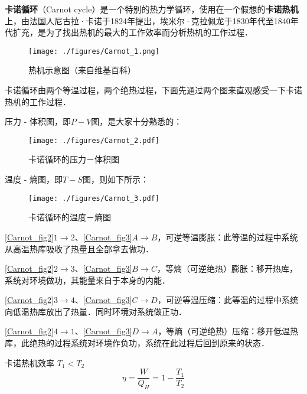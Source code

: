 
\textbf{卡诺循环}（Carnot cycle）是一个特别的热力学循环，使用在一个假想的\textbf{卡诺热机}上，由法国人尼古拉·卡诺于1824年提出，埃米尔·克拉佩龙于1830年代至1840年代扩充，是为了找出热机的最大的工作效率而分析热机的工作过程．

\begin{figure}[ht]
\centering
\texttt{[image: ./figures/Carnot\_1.png]}
\caption{热机示意图（来自维基百科）} \label{Carnot_fig1}
\end{figure}
卡诺循环由两个等温过程，两个绝热过程，下面先通过两个图来直观感受一下卡诺热机的工作过程．

压力 - 体积图，即$P-V$图，是大家十分熟悉的：
\begin{figure}[ht]
\centering
\texttt{[image: ./figures/Carnot\_2.pdf]}
\caption{卡诺循环的压力－体积图} \label{Carnot_fig2}
\end{figure}

温度 - 熵图，即$T-S$图，则如下所示：
\begin{figure}[ht]
\centering
\texttt{[image: ./figures/Carnot\_3.pdf]}
\caption{卡诺循环的温度－熵图} \label{Carnot_fig3}
\end{figure}

\autoref{Carnot_fig2}$1\to 2$、\autoref{Carnot_fig3}$A\to B$，可逆等温膨胀：此等温的过程中系统从高温热库吸收了热量且全部拿去做功．

\autoref{Carnot_fig2}$2\to 3$、\autoref{Carnot_fig3}$B\to C$，等熵（可逆绝热）膨胀：移开热库，系统对环境做功，其能量来自于本身的内能．

\autoref{Carnot_fig2}$3\to 4$、\autoref{Carnot_fig3}$C\to D$，可逆等温压缩：此等温的过程中系统向低温热库放出了热量．同时环境对系统做正功．

\autoref{Carnot_fig2}$4\to 1$、\autoref{Carnot_fig3}$D\to A$，等熵（可逆绝热）压缩：移开低温热库，此绝热的过程系统对环境作负功，系统在此过程后回到原来的状态．


卡诺热机效率 $T_1 < T_2$
\begin{equation}
\eta = \frac{W}{Q_H} = 1 - \frac{T_1}{T_2}
\end{equation}
